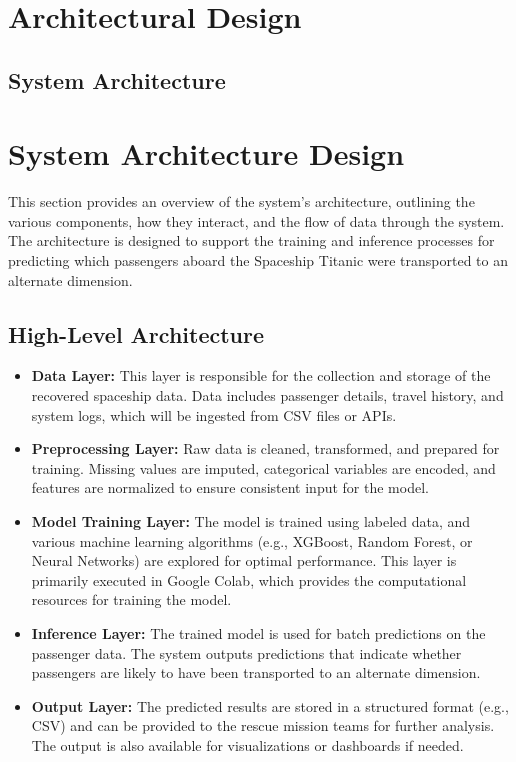 \documentclass[15pt]{article}
\begin{document}
\section{Architectural Design}
\subsection{System Architecture}
\section{System Architecture Design}

This section provides an overview of the system’s architecture, outlining the various components, how they interact, and the flow of data through the system. The architecture is designed to support the training and inference processes for predicting which passengers aboard the Spaceship Titanic were transported to an alternate dimension.

\subsection{High-Level Architecture}
\begin{itemize}
    \item \textbf{Data Layer:} This layer is responsible for the collection and storage of the recovered spaceship data. Data includes passenger details, travel history, and system logs, which will be ingested from CSV files or APIs.
    \item \textbf{Preprocessing Layer:} Raw data is cleaned, transformed, and prepared for training. Missing values are imputed, categorical variables are encoded, and features are normalized to ensure consistent input for the model.
    \item \textbf{Model Training Layer:} The model is trained using labeled data, and various machine learning algorithms (e.g., XGBoost, Random Forest, or Neural Networks) are explored for optimal performance. This layer is primarily executed in Google Colab, which provides the computational resources for training the model.
    \item \textbf{Inference Layer:} The trained model is used for batch predictions on the passenger data. The system outputs predictions that indicate whether passengers are likely to have been transported to an alternate dimension.
    \item \textbf{Output Layer:} The predicted results are stored in a structured format (e.g., CSV) and can be provided to the rescue mission teams for further analysis. The output is also available for visualizations or dashboards if needed.
\end{itemize}
\end{document}
